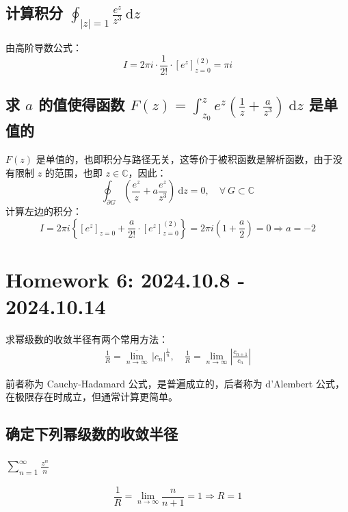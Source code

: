 \documentclass[UTF8]{report}
\def\C{\mathbb{C}}
\theoremstyle{MyLineTheoremStyle} %
\theoremstyle{MyBlockTheoremStyle} %
\theoremstyle{MySubsubsectionStyle} %
\begin{document}
\section{计算积分 $\displaystyle \oint_{| z | = 1} \frac{e^z }{z^3} \ \mathrm{d}z$}
由高阶导数公式：
\begin{equation}
I = 2 \pi i \cdot \frac{1}{2!} \cdot\left[e^z \right]^{(2)}_{z = 0} =  \pi i
\end{equation}

\section{求 $a$ 的值使得函数 $\displaystyle F(z) = \int_{z_0}^z e^z \left( \frac{1}{z} + \frac{a}{z^3}\right) \ \mathrm{d}z$ 是单值的}

$F(z)$ 是单值的，也即积分与路径无关，这等价于被积函数是解析函数，由于没有限制 $z$ 的范围，也即 $z \in \C$，因此：
\begin{equation}
\oint_{\partial G} \left( \frac{e^z}{z} + a\frac{e^z}{z^3} \right) \ \mathrm{d}z = 0,\quad \forall\ G \subset \C 
\end{equation}
计算左边的积分：
\begin{equation}
I =  2 \pi i \left\{ \left[e^z\right]_{z=0} + \frac{a}{2!}\cdot\left[e^z\right]^{(2)}_{z=0} \right\} = 2 \pi i \left( 1 + \frac{a}{2} \right) = 0 \Longrightarrow a = -2
\end{equation}

\chapter{Homework 6: 2024.10.8 - 2024.10.14}
\thispagestyle{fancy}

求幂级数的收敛半径有两个常用方法：
\begin{gather}
\frac{1}{R} = \overline{\lim_{n \to \infty}} \, | c_n |^{\frac{1}{n}} ,\quad 
\frac{1}{R} = \lim_{n \to \infty} \left| \frac{c_{n+1}}{c_{n}} \right|
\end{gather}

前者称为 Cauchy-Hadamard 公式，是普遍成立的，后者称为 d'Alembert 公式，在极限存在时成立，但通常计算更简单。

\section{确定下列幂级数的收敛半径}

\subsection{$\displaystyle \sum_{n=1}^{\infty} \frac{z^n}{n}$}
\noindent
\begin{equation}
    \frac{1}{R} = \lim_{n \to \infty} \frac{n}{n+1} = 1 \Longrightarrow R = 1
\end{equation}
\end{document}
